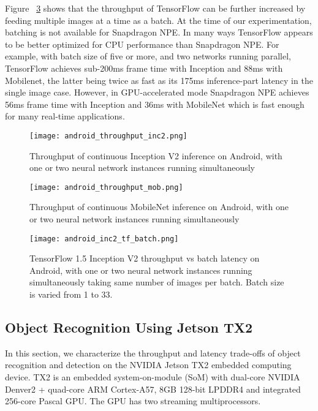 \documentclass[sigconf]{acmart}
\begin{document}
Figure ~\ref{fig:android_inc2_tf_batch} shows that the throughput of TensorFlow can be further increased by feeding multiple images at a time as a batch. At the time of our experimentation, batching is not available for Snapdragon NPE. In many ways TensorFlow appears to be better optimized for CPU performance than Snapdragon NPE. For example, with batch size of five or more, and two networks running parallel, TensorFlow achieves sub-200ms frame time with Inception and 88ms with Mobilenet, the latter being twice as fast as its 175ms inference-part latency in the single image case. However, in GPU-accelerated mode Snapdragon NPE achieves 56ms frame time with Inception and 36ms with MobileNet which is fast enough for many real-time applications.

\begin{figure}[t]
\centering
\texttt{[image: android\_throughput\_inc2.png]}
\caption{Throughput of continuous Inception V2 inference on Android, with one or two neural network instances running simultaneously}
\label{fig:android_throughput_inc2}
\end{figure}\begin{figure}[t]
\centering
\texttt{[image: android\_throughput\_mob.png]}
\caption{Throughput of continuous MobileNet inference on Android, with one or two neural network instances running simultaneously}
\label{fig:android_throughput_mob}
\end{figure}\begin{figure}[t]
\centering
\texttt{[image: android\_inc2\_tf\_batch.png]}
\caption{TensorFlow 1.5 Inception V2 throughput vs batch latency on Android, with one or two neural network instances running simultaneously taking same number of images per batch. Batch size is varied from 1 to 33.}
\label{fig:android_inc2_tf_batch}
\end{figure}\subsection{Object Recognition Using Jetson TX2}\label{sec:jetson_recognition}

In this section, we characterize the throughput and latency trade-offs of object recognition and detection on the NVIDIA Jetson TX2 embedded computing device. TX2 is an embedded system-on-module (SoM) with dual-core NVIDIA Denver2 + quad-core ARM Cortex-A57, 8GB 128-bit LPDDR4 and integrated 256-core Pascal GPU. The GPU has two streaming multiprocessors.
\end{document}
